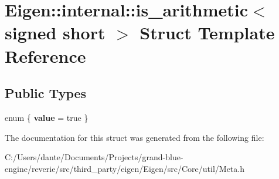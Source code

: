 \hypertarget{struct_eigen_1_1internal_1_1is__arithmetic_3_01signed_01short_01_4}{}\section{Eigen\+::internal\+::is\+\_\+arithmetic$<$ signed short $>$ Struct Template Reference}
\label{struct_eigen_1_1internal_1_1is__arithmetic_3_01signed_01short_01_4}
\subsection*{Public Types}
\begin{DoxyCompactItemize}
\item 
\mbox{\label{struct_eigen_1_1internal_1_1is__arithmetic_3_01signed_01short_01_4_aee4080e178626f759e3759b37be3b082}} 
enum \{ {\bfseries value} = true
 \}
\end{DoxyCompactItemize}


The documentation for this struct was generated from the following file\+:\begin{DoxyCompactItemize}
\item 
C\+:/\+Users/dante/\+Documents/\+Projects/grand-\/blue-\/engine/reverie/src/third\+\_\+party/eigen/\+Eigen/src/\+Core/util/Meta.\+h\end{DoxyCompactItemize}
